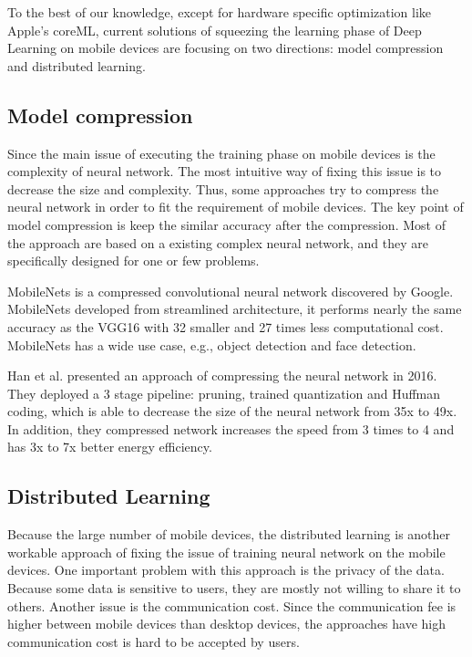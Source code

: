 \documentclass[article]{aaltoseries}
\begin{document}
To the best of our knowledge, except for hardware specific optimization like Apple's coreML\cite{AppleInc.},
 current solutions of squeezing the learning phase of Deep Learning on mobile devices 
are focusing on two directions: model compression and distributed learning.



\subsection{Model compression}


Since the main issue of executing the training phase on mobile devices is the complexity of neural network.
The most intuitive way of fixing this issue is to decrease the size and complexity. Thus, some approaches try
to compress the neural network in order to fit the requirement of mobile devices.
The key point of model compression is keep the similar accuracy after the compression. Most of the approach
are based on a existing complex neural network, and they are specifically designed for one or few problems. 


MobileNets\cite{MobileNets2017} is a compressed convolutional neural network discovered by Google. MobileNets developed 
from streamlined architecture, it performs nearly the same accuracy as the VGG16\cite{simonyan2014very} with 32 smaller
and 27 times less computational cost. MobileNets has a wide use case, e.g., object detection and face detection.

Han et al.\cite{Han2015} presented an approach of compressing the neural network in 2016. 
They deployed a 3 stage pipeline: pruning, trained quantization and Huffman coding, which is able to decrease
the size of the neural network from 35x to 49x. In addition, they compressed network increases the speed from 3 times to 4
and has 3x to 7x better energy efficiency.

\subsection{Distributed Learning}

Because the large number of mobile devices, the distributed learning is another workable approach of fixing the
issue of training neural network on the mobile devices.
One important problem with this approach is the privacy of the data. Because some data is sensitive to users, 
they are mostly not willing to share it to others. Another issue is the communication cost. Since the communication fee
is higher between mobile devices than desktop devices, the approaches have high communication cost is hard to be 
accepted by users.
\end{document}

